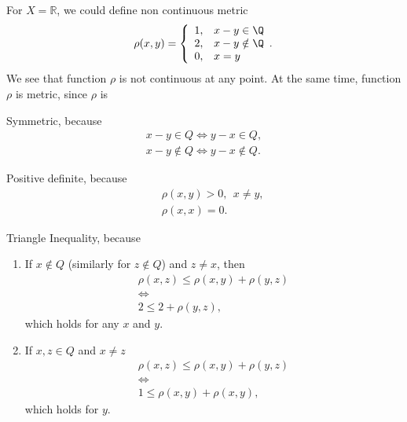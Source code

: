 \Ex For $X=\mathbb{R}$, we could define non continuous metric
    \[
        \rho(x,y) = \left\{
            \begin{array}{cl}
                1, & x-y \in \Q \\
                2, & x -y \notin \Q\\
                0, & x = y
            \end{array}.
        \right. 
    \]
    We see that function $\rho$ is not continuous at any point. At the same time, function $\rho$ is metric, since $\rho$ is 
    \begin{enumerate*}
        \item Symmetric, because
        \begin{eqnarray}
            x-y\in Q \Leftrightarrow y-x\in Q,\nonumber\\
            x-y\notin Q \Leftrightarrow y-x\notin Q.\nonumber
        \end{eqnarray}
        \item Positive definite, because
        \begin{eqnarray}
            &&\rho(x,y) > 0, \ \  x \neq y,\nonumber\\
            &&\rho(x,x) = 0.\nonumber
        \end{eqnarray}
        \item Triangle Inequality, because 
        \begin{enumerate}
            \item If $x\notin Q$ (similarly for $z\notin Q$) and $z\neq x$, then 
            \begin{eqnarray}
                &\rho(x,z)\leq \rho(x,y)+ \rho(y,z)&\nonumber\\
                &\Leftrightarrow&\nonumber\\
                &2 \leq 2 + \rho (y,z),&\nonumber
            \end{eqnarray}
            which holds for any $x$ and $y$.
            \item  If $x,z\in Q$ and $x\neq z$
            \begin{eqnarray}
                &\rho(x,z)\leq \rho(x,y)+ \rho(y,z)&\nonumber\\
                &\Leftrightarrow&\nonumber\\
                &1 \leq \rho (x,y) + \rho (x,y),&\nonumber
        \end{eqnarray}
            which holds for $y$.
        \end{enumerate}
    \end{enumerate*}

